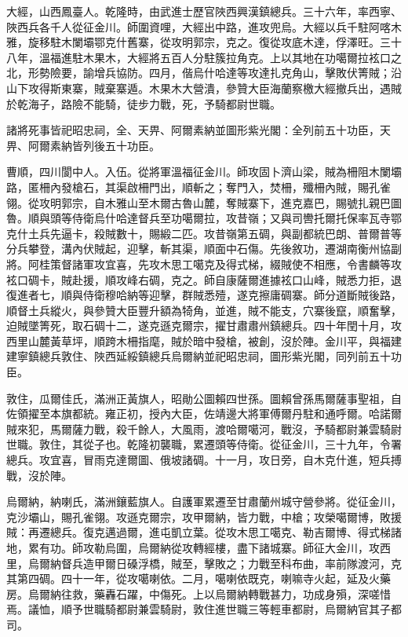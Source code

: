 \begin{pinyinscope}
大經，山西鳳臺人。乾隆時，由武進士歷官陜西興漢鎮總兵。三十六年，率西寧、陜西兵各千人從征金川。師圍資哩，大經出中路，進攻兜烏。大經以兵千駐阿喀木雅，旋移駐木闌壩鄂克什舊寨，從攻明郭宗，克之。復從攻底木達，俘澤旺。三十八年，溫福進駐木果木，大經將五百人分駐簇拉角克。上以其地在功噶爾拉袨口之北，形勢險要，諭增兵協防。四月，偕烏什哈達等攻達扎克角山，擊敗伏箐賊；沿山下攻得斯東寨，賊棄寨遁。木果木大營潰，參贊大臣海蘭察檄大經撤兵出，遇賊於乾海子，路險不能騎，徒步力戰，死，予騎都尉世職。

諸將死事皆祀昭忠祠，全、天畀、阿爾素納並圖形紫光閣：全列前五十功臣，天畀、阿爾素納皆列後五十功臣。

曹順，四川閬中人。入伍。從將軍溫福征金川。師攻固卜濟山梁，賊為柵阻木闌壩路，匿柵內發槍石，其渠啟柵門出，順斬之；奪門入，焚柵，殲柵內賊，賜孔雀翎。從攻明郭宗，自木雅山至木爾古魯山麓，奪賊寨下，進克嘉巴，賜號扎親巴圖魯。順與頭等侍衛烏什哈達督兵至功噶爾拉，攻昔嶺；又與司轡托爾托保率瓦寺鄂克什土兵先逼卡，殺賊數十，賜緞二匹。攻昔嶺第五碉，與副都統巴朗、普爾普等分兵攀登，溝內伏賊起，迎擊，斬其渠，順面中石傷。先後敘功，遷湖南衡州協副將。阿桂策督諸軍攻宜喜，先攻木思工噶克及得式梯，綴賊使不相應，令書麟等攻袨口碉卡，賊赴援，順攻峰右碉，克之。師自康薩爾進據袨口山峰，賊悉力拒，退復進者七，順與侍衛穆哈納等迎擊，群賊悉殪，遂克擦庸碉寨。師分道斷賊後路，順督土兵縱火，與參贊大臣豐升額為犄角，並進，賊不能支，穴寨後竄，順奮擊，迫賊墜箐死，取石碉十二，遂克遜克爾宗，擢甘肅肅州鎮總兵。四十年閏十月，攻西里山麓黃草坪，順跨木柵指麾，賊於暗中發槍，被創，沒於陣。金川平，與福建建寧鎮總兵敦住、陜西延綏鎮總兵烏爾納並祀昭忠祠，圖形紫光閣，同列前五十功臣。

敦住，瓜爾佳氏，滿洲正黃旗人，昭勛公圖賴四世孫。圖賴曾孫馬爾薩事聖祖，自佐領擢至本旗都統。雍正初，授內大臣，佐靖邊大將軍傅爾丹駐和通呼爾。哈諾爾賊來犯，馬爾薩力戰，殺千餘人，大風雨，渡哈爾噶河，戰沒，予騎都尉兼雲騎尉世職。敦住，其從子也。乾隆初襲職，累遷頭等侍衛。從征金川，三十九年，令署總兵。攻宜喜，冒雨克達爾圖、俄坡諸碉。十一月，攻日旁，自木克什進，短兵搏戰，沒於陣。

烏爾納，納喇氏，滿洲鑲藍旗人。自護軍累遷至甘肅蘭州城守營參將。從征金川，克沙壩山，賜孔雀翎。攻遜克爾宗，攻甲爾納，皆力戰，中槍；攻榮噶爾博，敗援賊：再遷總兵。復克邁過爾，進屯凱立葉。從攻木思工噶克、勒吉爾博、得式梯諸地，累有功。師攻勒烏圍，烏爾納從攻轉經樓，盡下諸城寨。師征大金川，攻西里，烏爾納督兵造甲爾日磉浮橋，賊至，擊敗之；力戰至科布曲，率前隊渡河，克其第四碉。四十一年，從攻噶喇依。二月，噶喇依既克，喇嘛寺火起，延及火藥房。烏爾納往救，藥轟石躍，中傷死。上以烏爾納轉戰甚力，功成身殞，深嗟惜焉。議恤，順予世職騎都尉兼雲騎尉，敦住進世職三等輕車都尉，烏爾納官其子都司。


\end{pinyinscope}
